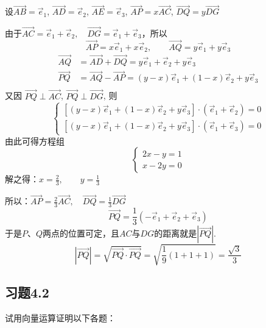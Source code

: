\begin{solution}
设$\Vec{AB}=\vec{e}_1$, $\Vec{AD}=\vec{e}_2$, $\Vec{AE}=\vec{e}_3$, $\Vec{AP}=x\Vec{AC}$, $\Vec{DQ}=y\Vec{DG}$ 

由于$\Vec{AC}=\vec{e}_1+\vec{e}_2,\quad \Vec{DG}=\vec{e}_1+\vec{e}_3$，所以
\[\Vec{AP}=x\vec{e}_1+x\vec{e}_2,\qquad \Vec{AQ}=y\vec{e}_1+y\vec{e}_3\]
\[\begin{split}
    \Vec{AQ}&=\Vec{AD}+\Vec{DQ}=y\vec{e}_1+\vec{e}_2+y\vec{e}_3\\
    \Vec{PQ}&=\Vec{AQ}-\Vec{AP}=(y-x)\vec{e}_1+(1-x)\vec{e}_2+y\vec{e}_3\\
\end{split}\]
又因 $\Vec{P Q} \perp \Vec{A C}$, $\Vec{P Q} \perp \Vec{D G}$, 则
\[\begin{cases}
    {\left[(y-x) \vec{e}_{1}+(1-x) \vec{e}_{2}+y \vec{e}_{3}\right] \cdot\left(\vec{e}_{1}+\vec{e}_{2}\right)=0} \\
    {\left[(y-x) \vec{e}_{1}+(1-x) \vec{e}_{2}+y \vec{e}_{3}\right] \cdot\left(\vec{e}_{1}+\vec{e}_{3}\right)=0}
\end{cases}\]
由此可得方程组
\[\begin{cases}
    2 x-y=1 \\
x-2 y=0
\end{cases}\]
解之得：$x=\frac{2}{3}, \qquad y=\frac{1}{3}$

所以：$\Vec{AP}=\frac{2}{3}\Vec{AC},\quad \Vec{DQ}=\frac{1}{3}\Vec{DG}$
\[\Vec{PQ}=\frac{1}{3}\left(-\vec{e}_1+\vec{e}_2+\vec{e}_3\right)\]
于是$P$、$Q$两点的位置可定，且$AC$与$DG$的距离就是$|\Vec{PQ}|$. 
\[|\Vec{PQ}|=\sqrt{\Vec{PQ}\cdot \Vec{PQ}}=\sqrt{\frac{1}{9}(1+1+1)}=\frac{\sqrt{3}}{3}\]
\end{solution}


\subsection*{习题4.2}

试用向量运算证明以下各题：

